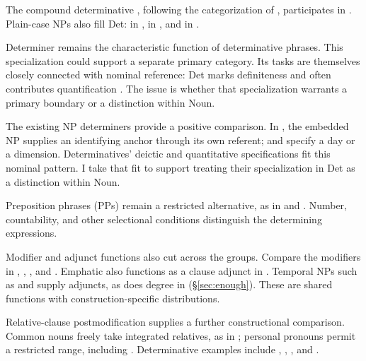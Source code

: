 \documentclass[12pt]{article}
\begin{document}
The compound determinative , following the categorization of \textcite[§1.3]{Payne2007}, participates in . Plain-case NPs also fill Det:  in ,  in , and  in  \citep[356]{huddleston2002}.

Determiner remains the characteristic function of determinative phrases. This specialization could support a separate primary category. Its tasks are themselves closely connected with nominal reference: Det marks definiteness and often contributes quantification \citep[354--359]{huddleston2002}. The issue is whether that specialization warrants a primary boundary or a distinction within Noun.

The existing NP determiners provide a positive comparison. In , the embedded NP supplies an identifying anchor through its own referent;  and  specify a day or a dimension. Determinatives' deictic and quantitative specifications fit this nominal pattern. I take that fit to support treating their specialization in Det as a distinction within Noun.

Preposition phrases (PPs) remain a restricted alternative, as in  and  \citep[356]{huddleston2002}. Number, countability, and other selectional conditions distinguish the determining expressions.

Modifier and adjunct functions also cut across the groups. Compare the modifiers in , , , and . Emphatic  also functions as a clause adjunct in  \citep[1496--1497]{huddleston2002}. Temporal NPs such as  and  supply adjuncts, as does degree  in  (§\ref{sec:enough}). These are shared functions with construction-specific distributions.

Relative-clause postmodification supplies a further constructional comparison. Common nouns freely take integrated relatives, as in ; personal pronouns permit a restricted range, including  \citep[430]{huddleston2002}. Determinative examples include , , , and .
\end{document}
